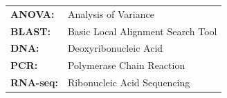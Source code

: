 
{
\begin{longtable}{@{}p{3.2cm}p{11.8cm}@{}}
\textbf{ANOVA:} & Analysis of Variance \\
\textbf{BLAST:} & Basic Local Alignment Search Tool \\
\textbf{DNA:} & Deoxyribonucleic Acid \\
\textbf{PCR:} & Polymerase Chain Reaction \\
\textbf{RNA-seq:} & Ribonucleic Acid Sequencing \\
\end{longtable}
}
